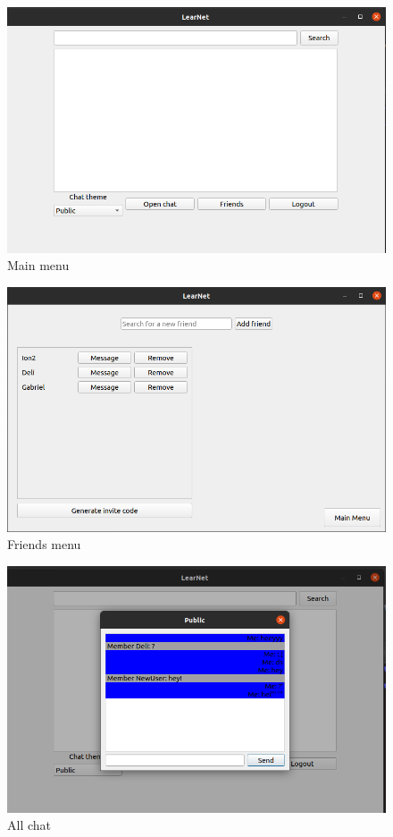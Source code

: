 \documentclass[runningheads]{llncs}
\begin{document}
\begin{figure}[H]
\includegraphics[width=\textwidth,height=\textheight,keepaspectratio]{images/mainmenu.png}
\caption{Main menu}
\end{figure}

\begin{figure}[H]
\includegraphics[width=\textwidth,height=\textheight,keepaspectratio]{images/friendsmenu.png}
\caption{Friends menu}
\end{figure}

\begin{figure}[H]
\includegraphics[width=\textwidth,height=\textheight,keepaspectratio]{images/allchat.png}
\caption{All chat}
\end{figure}
\end{document}
